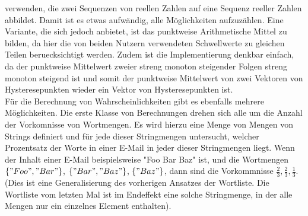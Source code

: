 \documentclass{article}
\theoremstyle{definition}
\theoremstyle{remark}
\begin{document}
verwenden, die zwei Sequenzen von reellen Zahlen auf eine Sequenz reeller
Zahlen abbildet. Damit ist es etwas aufw\"andig, alle M\"oglichkeiten
aufzuz\"ahlen. Eine Variante, die sich jedoch anbietet, ist das punktweise
Arithmetische Mittel zu bilden, da hier die von beiden Nutzern verwendeten
Schwellwerte zu gleichen Teilen beruecksichtigt werden. Zudem ist die
Implementierung denkbar einfach, da der punktweise Mittelwert zweier 
streng monoton steigender Folgen streng monoton steigend ist und somit 
der punktweise Mittelwert von zwei Vektoren von Hysteresepunkten wieder
ein Vektor von Hysteresepunkten ist. \\
F\"ur die Berechnung von Wahrscheinlichkeiten gibt es ebenfalls mehrere
M\"oglichkeiten. Die erste Klasse von Berechnungen drehen sich alle um 
die Anzahl der Vorkomnisse von Wortmengen. Es wird hierzu eine Menge von Mengen
von Strings definiert und f\"ur jede dieser Stringmengen untersucht, welcher
Prozentsatz der Worte in einer E-Mail in jeder dieser Stringmengen liegt.
Wenn der Inhalt einer E-Mail beispielsweise "Foo Bar Baz" ist, und die
Wortmengen \(\{"Foo", "Bar"\}\), \(\{"Bar", "Baz"\}\), \(\{"Baz"\}\), dann sind
die Vorkommnisse \(\frac{2}{3}, \frac{2}{3}, \frac{1}{3}\). (Dies ist eine
Generalisierung des vorherigen Ansatzes der Wortliste. Die Wortliste vom
letzten Mal ist im Endeffekt eine solche Stringmenge, in der alle Mengen
nur ein einzelnes Element enthalten).
\(<TODO|Bewertung>\)
\(<TODO|Phasendiagramm>\)
\end{document}
